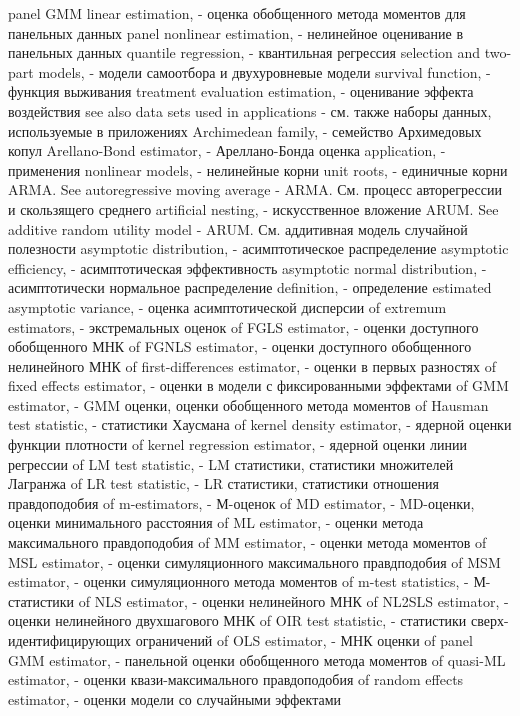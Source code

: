 panel GMM linear estimation, - оценка обобщенного метода моментов для панельных данных
panel nonlinear estimation, - нелинейное оценивание в панельных данных
quantile regression, - квантильная регрессия
selection and two-part models, - модели самоотбора и двухуровневые модели
survival function, - функция выживания
treatment evaluation estimation, - оценивание эффекта воздействия
see also data sets used in applications  - см. также наборы данных, используемые в приложениях
Archimedean family, - семейство Архимедовых копул
Arellano-Bond estimator, - Ареллано-Бонда оценка
application, - применения
nonlinear models, - нелинейные корни 
unit roots, - единичные корни
ARMA. See autoregressive moving average - ARMA. См. процесс авторегрессии и скользящего среднего
artificial nesting, - искусственное вложение
ARUM. See additive random utility model - ARUM. См. аддитивная модель случайной полезности
asymptotic distribution, - асимптотическое распределение
asymptotic efficiency, - асимптотическая эффективность
asymptotic normal distribution, - асимптотически нормальное распределение
definition, - определение
estimated asymptotic variance, - оценка асимптотической дисперсии
of extremum estimators, - экстремальных оценок
of FGLS estimator, - оценки доступного обобщенного МНК
of FGNLS estimator, - оценки доступного обобщенного нелинейного МНК
of first-differences estimator, - оценки в первых разностях
of fixed effects estimator, - оценки в модели с фиксированными эффектами
of GMM estimator, - GMM оценки, оценки обобщенного метода моментов
of Hausman test statistic, - статистики Хаусмана
of kernel density estimator, - ядерной оценки функции плотности
of kernel regression estimator, - ядерной оценки линии регрессии 
of LM test statistic, - LM статистики, статистики множителей Лагранжа
of LR test statistic, - LR статистики, статистики отношения правдоподобия
of m-estimators, - М-оценок
of MD estimator, - MD-оценки, оценки минимального расстояния
of ML estimator, - оценки метода максимального правдоподобия
of MM estimator, - оценки метода моментов
of MSL estimator, - оценки симуляционного максимального правдподобия
of MSM estimator, - оценки симуляционного метода моментов
of m-test statistics, - М-статистики 
of NLS estimator, - оценки нелинейного МНК
of NL2SLS estimator, - оценки нелинейного двухшагового МНК
of OIR test statistic, - статистики сверх-идентифицирующих ограничений
of OLS estimator, - МНК оценки 
of panel GMM estimator, - панельной оценки обобщенного метода моментов
of quasi-ML estimator, - оценки квази-максимального правдоподобия
of random effects estimator, - оценки модели со случайными эффектами 
